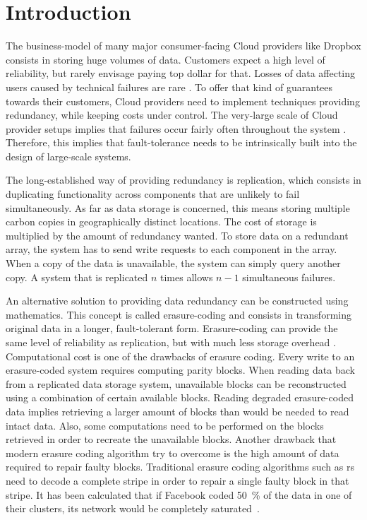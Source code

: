 \section{Introduction}

The business-model of many major consumer-facing Cloud providers like Dropbox consists in storing huge volumes of data.
Customers expect a high level of reliability, but rarely envisage paying top dollar for that.
Losses of data affecting users caused by technical failures are rare \cite{racs}.
To offer that kind of guarantees towards their customers, Cloud providers need to implement techniques providing redundancy, while keeping costs under control.
The very-large scale of Cloud provider setups implies that failures occur fairly often throughout the system \cite{failures-study}.
Therefore, this implies that fault-tolerance needs to be intrinsically built into the design of large-scale systems.

The long-established way of providing redundancy is replication, which consists in duplicating functionality across components that are unlikely to fail simultaneously.  As far as data storage is concerned, this means storing multiple carbon copies in geographically distinct locations.
The cost of storage is multiplied by the amount of redundancy wanted.
To store data on a redundant array, the system has to send write requests to each component in the array.
When a copy of the data is unavailable, the system can simply query another copy.
A system that is replicated $n$ times allows $n-1$ simultaneous failures.

An alternative solution to providing data redundancy can be constructed using mathematics.
This concept is called erasure-coding and consists in transforming original data in a longer, fault-tolerant form.
Erasure-coding can provide the same level of reliability as replication, but with much less storage overhead \cite{Weatherspoon2002}.
Computational cost is one of the drawbacks of erasure coding.
Every write to an erasure-coded system requires computing parity blocks.
When reading data back from a replicated data storage system, unavailable blocks can be reconstructed using a combination of certain available blocks.
Reading degraded erasure-coded data implies retrieving a larger amount of blocks than would be needed to read intact data.
Also, some computations need to be performed on the blocks retrieved in order to recreate the unavailable blocks.
Another drawback that modern erasure coding algorithm try to overcome is the high amount of data required to repair faulty blocks.
Traditional erasure coding algorithms such as \ac{rs} need to decode a complete stripe in order to repair a single faulty block in that stripe.
It has been calculated that if Facebook coded \SI{50}{\percent} of the data in one of their clusters, its network would be completely saturated~\cite{XorbasVLDB}.

